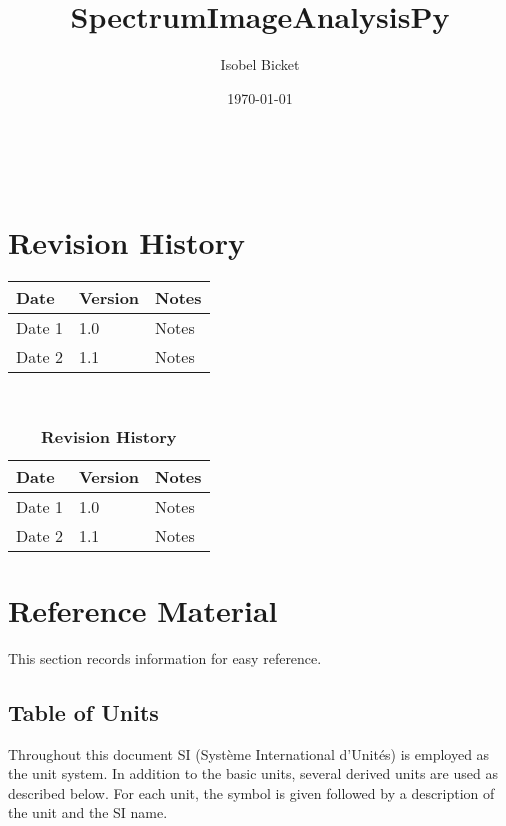 \documentclass[12pt]{article}
\begin{document}
\title{SpectrumImageAnalysisPy} 
\author{Isobel Bicket}
\date{\today}
	
\maketitle

~\newpage



\section{Revision History}

\begin{tabularx}{\textwidth}{p{3cm}p{2cm}X}
\toprule {\bf Date} & {\bf Version} & {\bf Notes}\\
\midrule
Date 1 & 1.0 & Notes\\
Date 2 & 1.1 & Notes\\
\bottomrule
\end{tabularx}

~\newpage

\tableofcontents

\begin{table}[bp]
\caption{\bf Revision History}
\begin{tabularx}{\textwidth}{p{3cm}p{2cm}X}
\toprule {\bf Date} & {\bf Version} & {\bf Notes}\\
\midrule
Date 1 & 1.0 & Notes\\
Date 2 & 1.1 & Notes\\
\bottomrule
\end{tabularx}
\end{table}

\section{Reference Material}

This section records information for easy reference.

\subsection{Table of Units}

Throughout this document SI (Syst\`{e}me International d'Unit\'{e}s) is employed
as the unit system.  In addition to the basic units, several derived units are
used as described below.  For each unit, the symbol is given followed by a
description of the unit and the SI name.
~\newline
\end{document}
